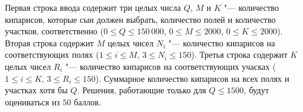 Первая строка ввода содержит три целых числа $Q$, $M$ и $K$ "--- количество
кипарисов, которые сын должен выбрать, количество полей и количество
участков, соответственно
($0 \le Q \le 150\,000$, $0 \le M \le 2000$, $0 \le K \le 2000$).
Вторая строка содержит $M$ целых чисел $N_i$ "--- количество кипарисов
на соответствующих полях ($1 \le i \le M$, $3 \le N_i \le 150$).
Третья строка содержит $K$ целых чисел $R_i$ "--- количество кипарисов
на соответствующих учасках ($1 \le i \le K$, $3 \le R_i \le 150$).
Суммарное количество кипарисов на всех полях и участках хотя бы $Q$. 
Решения, работающие только для $Q \le 1500$, будут оцениваться из $50$ баллов.

